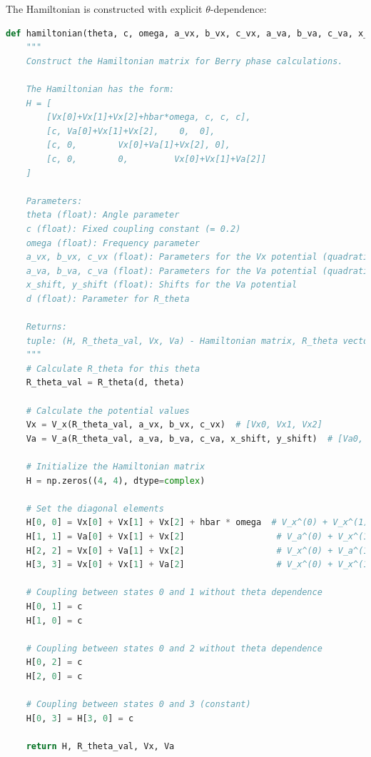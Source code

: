 \documentclass[12pt,a4paper]{article}
\begin{document}
The Hamiltonian is constructed with explicit $\theta$-dependence:

\begin{lstlisting}[language=Python, caption=Hamiltonian construction]
def hamiltonian(theta, c, omega, a_vx, b_vx, c_vx, a_va, b_va, c_va, x_shift, y_shift, d):
    """
    Construct the Hamiltonian matrix for Berry phase calculations.
    
    The Hamiltonian has the form:
    H = [
        [Vx[0]+Vx[1]+Vx[2]+hbar*omega, c, c, c],
        [c, Va[0]+Vx[1]+Vx[2],    0,  0],
        [c, 0,        Vx[0]+Va[1]+Vx[2], 0],
        [c, 0,        0,         Vx[0]+Vx[1]+Va[2]]
    ]
    
    Parameters:
    theta (float): Angle parameter
    c (float): Fixed coupling constant (= 0.2)
    omega (float): Frequency parameter
    a_vx, b_vx, c_vx (float): Parameters for the Vx potential (quadratic, linear, constant terms)
    a_va, b_va, c_va (float): Parameters for the Va potential (quadratic, linear, constant terms)
    x_shift, y_shift (float): Shifts for the Va potential
    d (float): Parameter for R_theta
    
    Returns:
    tuple: (H, R_theta_val, Vx, Va) - Hamiltonian matrix, R_theta vector, Vx and Va values
    """
    # Calculate R_theta for this theta
    R_theta_val = R_theta(d, theta)
    
    # Calculate the potential values
    Vx = V_x(R_theta_val, a_vx, b_vx, c_vx)  # [Vx0, Vx1, Vx2]
    Va = V_a(R_theta_val, a_va, b_va, c_va, x_shift, y_shift)  # [Va0, Va1, Va2]
    
    # Initialize the Hamiltonian matrix
    H = np.zeros((4, 4), dtype=complex)
    
    # Set the diagonal elements
    H[0, 0] = Vx[0] + Vx[1] + Vx[2] + hbar * omega  # V_x^(0) + V_x^(1) + V_x^(2) + hbar*omega
    H[1, 1] = Va[0] + Vx[1] + Vx[2]                  # V_a^(0) + V_x^(1) + V_x^(2)
    H[2, 2] = Vx[0] + Va[1] + Vx[2]                  # V_x^(0) + V_a^(1) + V_x^(2)
    H[3, 3] = Vx[0] + Vx[1] + Va[2]                  # V_x^(0) + V_x^(1) + V_a^(2)
    
    # Coupling between states 0 and 1 without theta dependence
    H[0, 1] = c 
    H[1, 0] = c 
    
    # Coupling between states 0 and 2 without theta dependence
    H[0, 2] = c 
    H[2, 0] = c
    
    # Coupling between states 0 and 3 (constant)
    H[0, 3] = H[3, 0] = c
    
    return H, R_theta_val, Vx, Va
\end{lstlisting}
\end{document}
